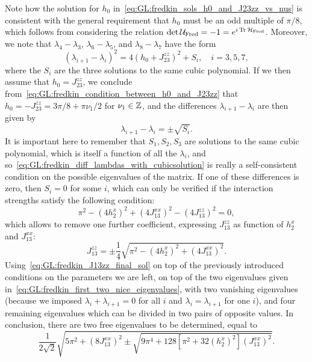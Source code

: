 Note how the solution for $h_0$ in~\cref{eq:GL:fredkin_sols_h0_and_J23zz_vs_nus} is consistent with the general requirement that $h_0$ must be an odd multiple of $\pi/8$, which follows from considering the relation $\det\UFred=-1=e^{i\Tr\HFred}$.
Moreover, we note that $\lambda_4-\lambda_3$, $\lambda_6-\lambda_5$, and $\lambda_8-\lambda_7$ have the form
\begin{equation}
    (\lambda_{i+1}-\lambda_i)^2 =
    4(h_0 + J_{23}^{zz})^2 + S_i,
    \quad i=3,5,7,
\end{equation}
where the $S_i$ are the three solutions to the same cubic polynomial.
If we then assume that $h_0=J_{23}^{zz}$, we conclude from~\cref{eq:GL:fredkin_condition_between_h0_and_J23zz} that
$h_0=-J_{23}^{zz}=3\pi/8+\pi \nu_1/2$ for $\nu_1\in\mathbb{Z}$, and the differences $\lambda_{i+1}-\lambda_i$ are then given by
\begin{equation}
    \lambda_{i+1} - \lambda_i = \pm \sqrt{S_i}.
    \label{eq:GL:fredkin_diff_lambdas_with_cubicsolution}
\end{equation}
It is important here to remember that $S_1, S_2, S_3$ are solutions to the same cubic polynomial, which is itself a function of all the $\lambda_i$, and so~\cref{eq:GL:fredkin_diff_lambdas_with_cubicsolution} is really a self-consistent condition on the possible eigenvalues of the matrix.
If one of these differences is zero, then $S_i=0$ for some $i$, which can only be verified if the interaction strengths satisfy the following condition:
\begin{equation}
    \pi^2
    - (4h_2^x)^2
    + (4 J_{13}^{xx})^2
    - (4 J_{13}^{zz})^2 = 0,
\end{equation}
which allows to remove one further coefficient, expressing $J_{13}^{zz}$ as function of $h_2^x$ and $J_{13}^{xx}$:
\begin{equation}
    J_{13}^{zz} = \pm\frac{1}{4}\sqrt{
        \pi^2 - (4 h_2^x)^2 + (4 J_{13}^{xx})^2
    }.
    \label{eq:GL:fredkin_J13zz_final_sol}
\end{equation}
Using~\cref{eq:GL:fredkin_J13zz_final_sol} on top of the previously introduced conditions on the parameters we are left, on top of the two eigenvalues given in~\cref{eq:GL:fredkin_first_two_nice_eigenvalues}, with two vanishing eigenvalues (because we imposed $\lambda_i+\lambda_{i+1}=0$ for all $i$ and $\lambda_i=\lambda_{i+1}$ for one $i$), and four remaining eigenvalues which can be divided in two pairs of opposite values.
In conclusion, there are two free eigenvalues to be determined, equal to
\begin{equation}
    \frac{1}{2\sqrt2}
    \sqrt{
        5\pi^2 + (8 J_{13}^{xx})^2
        \pm
        \sqrt{
            9\pi^4 + 128[\pi^2 + 32 (h_2^x)^2] (J_{13}^{xx})^2
        }
    }.
\end{equation}
